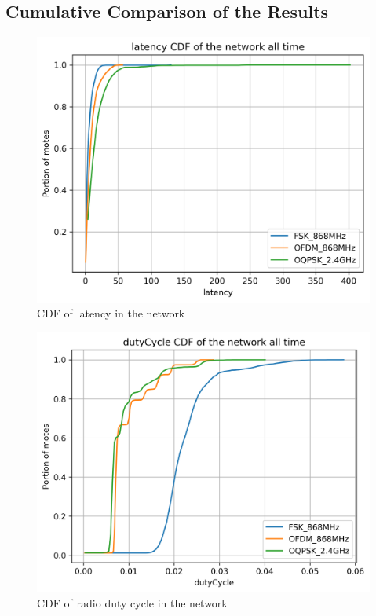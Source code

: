 \documentclass[journal]{IEEEtran}
\begin{document}
\subsection{Cumulative Comparison of the Results}
\label{sec:cimulative}



\begin{figure}
	\centering
	\includegraphics[width=0.90\columnwidth]{latency_cdf_plot_full}
	\caption{CDF of latency in the network} 
    \label{fig:latency_cdf_plot_full}
\end{figure}

\begin{figure}
	\centering
	\includegraphics[width=0.90\columnwidth]{dutyCycle_cdf_plot_full}
	\caption{CDF of radio duty cycle in the network} 
    \label{fig:dutyCycle_cdf_plot_full}
\end{figure}
\end{document}
